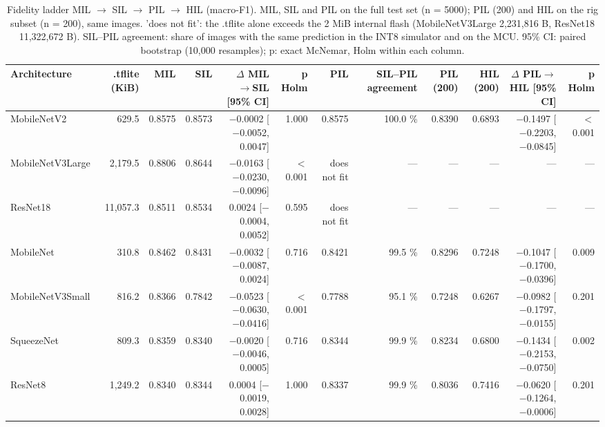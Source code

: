 
\begin{table}[htbp]
\centering
\scriptsize
\caption{Fidelity ladder MIL $\rightarrow$ SIL $\rightarrow$ PIL $\rightarrow$ HIL (macro-F1). MIL, SIL and PIL on the full test set (n = 5000); PIL (200) and HIL on the rig subset (n = 200), same images. 'does not fit': the .tflite alone exceeds the 2 MiB internal flash (MobileNetV3Large 2,231,816 B, ResNet18 11,322,672 B). SIL--PIL agreement: share of images with the same prediction in the INT8 simulator and on the MCU. 95\% CI: paired bootstrap (10,000 resamples); p: exact McNemar, Holm within each column.}
\label{tab:ladder-coco-1}
\begin{tabular}{lrrrrrrrrrrr}
\toprule
Architecture & .tflite (KiB) & MIL & SIL & $\Delta$ MIL$\rightarrow$SIL [95\% CI] & p Holm & PIL & SIL--PIL agreement & PIL (200) & HIL (200) & $\Delta$ PIL$\rightarrow$HIL [95\% CI] & p Holm \\
\midrule
MobileNetV2 & 629.5 & 0.8575 & 0.8573 & $-$0.0002 [$-$0.0052, 0.0047] & 1.000 & 0.8575 & 100.0 \% & 0.8390 & 0.6893 & $-$0.1497 [$-$0.2203, $-$0.0845] & $<$0.001 \\
MobileNetV3Large & 2,179.5 & 0.8806 & 0.8644 & $-$0.0163 [$-$0.0230, $-$0.0096] & $<$0.001 & does not fit & --- & --- & --- & --- & --- \\
ResNet18 & 11,057.3 & 0.8511 & 0.8534 & 0.0024 [$-$0.0004, 0.0052] & 0.595 & does not fit & --- & --- & --- & --- & --- \\
MobileNet & 310.8 & 0.8462 & 0.8431 & $-$0.0032 [$-$0.0087, 0.0024] & 0.716 & 0.8421 & 99.5 \% & 0.8296 & 0.7248 & $-$0.1047 [$-$0.1700, $-$0.0396] & 0.009 \\
MobileNetV3Small & 816.2 & 0.8366 & 0.7842 & $-$0.0523 [$-$0.0630, $-$0.0416] & $<$0.001 & 0.7788 & 95.1 \% & 0.7248 & 0.6267 & $-$0.0982 [$-$0.1797, $-$0.0155] & 0.201 \\
SqueezeNet & 809.3 & 0.8359 & 0.8340 & $-$0.0020 [$-$0.0046, 0.0005] & 0.716 & 0.8344 & 99.9 \% & 0.8234 & 0.6800 & $-$0.1434 [$-$0.2153, $-$0.0750] & 0.002 \\
ResNet8 & 1,249.2 & 0.8340 & 0.8344 & 0.0004 [$-$0.0019, 0.0028] & 1.000 & 0.8337 & 99.9 \% & 0.8036 & 0.7416 & $-$0.0620 [$-$0.1264, $-$0.0006] & 0.201 \\
\bottomrule
\end{tabular}
\end{table}

